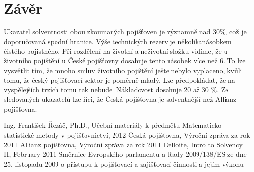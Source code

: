 \documentclass[12pt,oneside]{fithesis}
\begin{document}
\section{Závěr}
Ukazatel solventnosti obou zkoumaných pojišťoven je významně nad 30\%, což je doporučovaná spodní hranice. Výše technických rezerv je několikanásobkem čistého pojistného. Při rozdělení na životní a neživotní složku vidíme, že u životního pojištění u České pojišťovny dosahuje tento násobek více než 6. To lze vysvětlit tím, že mnoho smluv životního pojištění ješte nebylo vyplaceno, kvůli tomu, že český pojišťovací sektor je poměrně mladý. Lze předpokládat, že na vyspělejších trzích tomu tak nebude. Nákladovost dosahuje 20 až 30 \%. Ze sledovaných ukazatelů lze říci, že Česká pojišťovna je solventnější než Allianz pojišťovna.

\begin{thebibliography}{9}

Ing. František Řezáč, Ph.D., Učební materiály k předmětu Matematicko-statistické metody v pojišťovnictví, 2012
Česká pojišťovna, Výroční zpráva za rok 2011
Allianz pojišťovna, Výroční zpráva za rok 2011
Delloite, Intro to Solvency II, February 2011
Směrnice Evropského parlamentu a Rady 2009/138/ES ze dne 25. listopadu 2009 o přístupu k pojišťovací a zajišťovací činnosti a jejím výkonu
\end{thebibliography}
\end{document}
